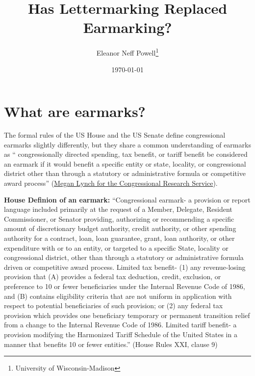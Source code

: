 \documentclass{article}
\title{Has Lettermarking Replaced Earmarking?}
\author{Eleanor Neff Powell\thanks{University of Wisconsin-Madison}}
\date{\today}
\begin{document}
\maketitle

\section{What are earmarks?}

The formal rules of the US House and the US Senate define congressional earmarks slightly differently, but they share a common understanding of earmarks as `` congressionally directed spending, tax benefit, or tariff benefit be considered
an earmark if it would benefit a specific entity or state, locality, or congressional district other
than through a statutory or administrative formula or competitive award process'' (\href{https://fas.org/sgp/crs/misc/R45429.pdf}{Megan Lynch for the Congressional Research Service}).

\textbf{House Definion of an earmark:} ``Congressional earmark- a provision or report language
included primarily at the request of a Member,
Delegate, Resident Commissioner, or Senator
providing, authorizing or recommending a specific
amount of discretionary budget authority, credit
authority, or other spending authority for a contract,
loan, loan guarantee, grant, loan authority, or other
expenditure with or to an entity, or targeted to a
specific State, locality or congressional district, other
than through a statutory or administrative formula
driven or competitive award process.
Limited tax benefit- (1) any revenue-losing provision
that (A) provides a federal tax deduction, credit,
exclusion, or preference to 10 or fewer beneficiaries
under the Internal Revenue Code of 1986, and (B)
contains eligibility criteria that are not uniform in
application with respect to potential beneficiaries of
such provision; or (2) any federal tax provision which
provides one beneficiary temporary or permanent
transition relief from a change to the Internal Revenue
Code of 1986.
Limited tariff benefit- a provision modifying the
Harmonized Tariff Schedule of the United States in a
manner that benefits 10 or fewer entities.'' (House Rules XXI, clause 9)
\end{document}

